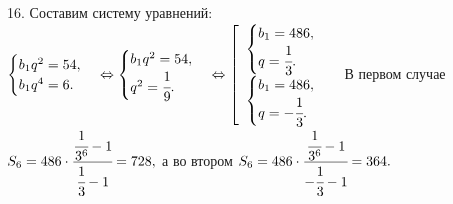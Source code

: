 16. Составим систему уравнений: $\begin{cases}b_1q^2=54,\\b_1q^4=6.\end{cases}\Leftrightarrow\begin{cases}b_1q^2=54,\\q^2=\cfrac{1}{9}.\end{cases}
\Leftrightarrow\left[\begin{array}{l}\begin{cases}b_1=486,\\q=\cfrac{1}{3}.\end{cases}\\ \begin{cases}b_1=486,\\q=-\cfrac{1}{3}.\end{cases}\end{array}\right.$ В первом случае
$S_6=486\cdot\cfrac{\cfrac{1}{3^6}-1}{\cfrac{1}{3}-1}=728,$ а во втором $S_6=486\cdot\cfrac{\cfrac{1}{3^6}-1}{-\cfrac{1}{3}-1}=364.$\\
